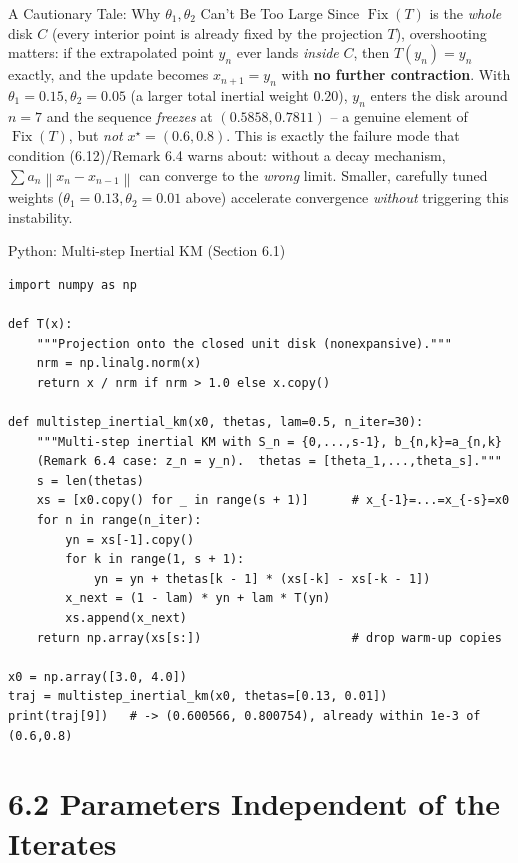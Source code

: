\documentclass[aspectratio=169,10pt]{beamer}
\newcommand{\norm}[1]{\left\|#1\right\|}
\newcommand{\Fix}{\operatorname{Fix}}
\begin{document}
\begin{frame}{A Cautionary Tale: Why $\theta_1,\theta_2$ Can't Be Too Large}
Since $\Fix(T)$ is the \emph{whole} disk $C$ (every interior point is
already fixed by the projection $T$), overshooting matters: if the
extrapolated point $y_n$ ever lands \emph{inside} $C$, then
$T(y_n)=y_n$ exactly, and the update becomes $x_{n+1}=y_n$ with
\textbf{no further contraction}. With $\theta_1=0.15,\theta_2=0.05$
(a larger total inertial weight $0.20$), $y_n$ enters the disk around
$n=7$ and the sequence \emph{freezes} at $(0.5858,0.7811)$ -- a genuine
element of $\Fix(T)$, but \emph{not} $x^\star=(0.6,0.8)$. This is exactly
the failure mode that condition (6.12)/Remark 6.4 warns about: without a
decay mechanism, $\sum a_n\norm{x_n-x_{n-1}}$ can converge to the
\emph{wrong} limit. Smaller, carefully tuned weights ($\theta_1=0.13,
\theta_2=0.01$ above) accelerate convergence \emph{without} triggering
this instability.
\end{frame}

\begin{frame}[fragile]{Python: Multi-step Inertial KM (Section 6.1)}
\begin{lstlisting}
import numpy as np

def T(x):
    """Projection onto the closed unit disk (nonexpansive)."""
    nrm = np.linalg.norm(x)
    return x / nrm if nrm > 1.0 else x.copy()

def multistep_inertial_km(x0, thetas, lam=0.5, n_iter=30):
    """Multi-step inertial KM with S_n = {0,...,s-1}, b_{n,k}=a_{n,k}
    (Remark 6.4 case: z_n = y_n).  thetas = [theta_1,...,theta_s]."""
    s = len(thetas)
    xs = [x0.copy() for _ in range(s + 1)]      # x_{-1}=...=x_{-s}=x0
    for n in range(n_iter):
        yn = xs[-1].copy()
        for k in range(1, s + 1):
            yn = yn + thetas[k - 1] * (xs[-k] - xs[-k - 1])
        x_next = (1 - lam) * yn + lam * T(yn)
        xs.append(x_next)
    return np.array(xs[s:])                     # drop warm-up copies

x0 = np.array([3.0, 4.0])
traj = multistep_inertial_km(x0, thetas=[0.13, 0.01])
print(traj[9])   # -> (0.600566, 0.800754), already within 1e-3 of (0.6,0.8)
\end{lstlisting}
\end{frame}

\section{6.2 Parameters Independent of the Iterates}
\end{document}
